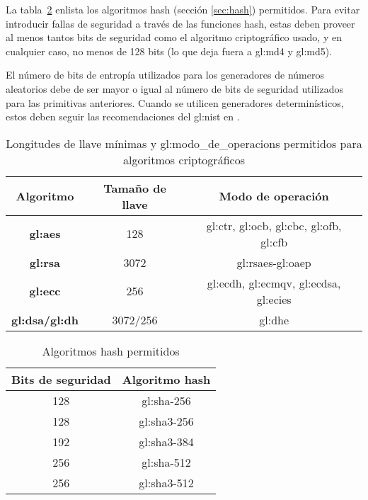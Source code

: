 
La tabla~\ref{hash_permitidos} enlista los algoritmos hash (sección
\ref{sec:hash}) permitidos. Para evitar introducir fallas de seguridad a
través de las funciones hash, estas deben proveer al menos tantos bits de
seguridad como el algoritmo criptográfico usado, y en cualquier caso, no
menos de 128 bits (lo que deja fuera a \gls{gl:md4} y \gls{gl:md5}).

El número de bits de entropía utilizados para los generadores de números
aleatorios debe de ser mayor o igual al número de bits de seguridad utilizados
para las primitivas anteriores. Cuando se utilicen generadores determinísticos,
estos deben seguir las recomendaciones del \gls{gl:nist} en
\cite{nist_aleatorios}.

\newpage

\begin{table}[H]
  \centering
  \begin{tabular}{| c | c | c |}
    \hline
    \textbf{Algoritmo} &
    \textbf{Tamaño de llave} &
    \textbf{Modo de operación} \\ [0.5ex]
    \hline
    \textbf{\gls{gl:aes}} &
    128 &
    \acrshort{gl:ctr},
    \acrshort{gl:ocb},
    \acrshort{gl:cbc},
    \acrshort{gl:ofb},
    \acrshort{gl:cfb} \\
    \hline
    \textbf{\gls{gl:rsa}} &
    3072 &
    \acrshort{gl:rsaes}-\acrshort{gl:oaep} \\
    \hline
    \textbf{\gls{gl:ecc}} &
    256 &
    \acrshort{gl:ecdh},
    \acrshort{gl:ecmqv},
    \acrshort{gl:ecdsa},
    \acrshort{gl:ecies} \\
    \hline
    \textbf{\gls{gl:dsa}/\gls{gl:dh}} &
    3072/256 &
    \acrshort{gl:dhe}\\
    \hline
  \end{tabular}
  \caption{Longitudes de llave mínimas y \glspl{gl:modo_de_operacion}
      permitidos para algoritmos criptográficos}
  \label{minimo_llaves}
\end{table}

\begin{table}[H]
  \centering
  \begin{tabular}{| c | c |}
    \hline
    \textbf{Bits de seguridad} &
    \textbf{Algoritmo hash} \\ [0.5ex]
    \hline
    128 & \gls{gl:sha}-256 \\
    \hline
    128 & \gls{gl:sha}3-256 \\
    \hline
    192 & \gls{gl:sha}3-384 \\
    \hline
    256 & \gls{gl:sha}-512 \\
    \hline
    256 & \gls{gl:sha}3-512 \\
    \hline
  \end{tabular}
  \caption{Algoritmos hash permitidos}
  \label{hash_permitidos}
\end{table}
